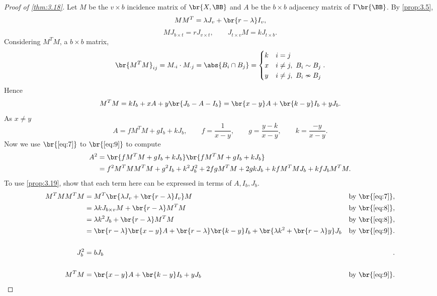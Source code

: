 \begin{proof}[Proof of \ref{thm:3.18}]
Let $ M $ be the $ v \times b $ incidence matrix of $ \br{X, \BB} $ and $ A $ be the $ b \times b $ adjacency matrix of $ \Gamma\br{\BB} $. By \ref{prop:3.5},
\begin{equation}
\label{eq:7}
MM^T = \lambda J_v + \br{r - \lambda}I_v,
\end{equation}
\begin{equation}
\label{eq:8}
MJ_{b \times t} = rJ_{v \times t}, \qquad J_{t \times v}M = kJ_{t \times b}.
\end{equation}
Considering $ M^TM $, a $ b \times b $ matrix,
$$ \br{M^TM}_{ij} = M_{\cdot i} \cdot M_{\cdot j} = \abs{B_i \cap B_j} =
\begin{cases}
k & i = j \\
x & i \ne j, \ B_i \sim B_j \\
y & i \ne j, \ B_i \nsim B_j
\end{cases}.
$$
Hence
\begin{equation}
\label{eq:9}
M^TM = kI_b + xA + y\br{J_b - A - I_b} = \br{x - y}A + \br{k - y}I_b + yJ_b.
\end{equation}
As $ x \ne y $
$$ A = fM^TM + gI_b + kJ_b, \qquad f = \dfrac{1}{x - y}, \qquad g = \dfrac{y - k}{x - y}, \qquad k = \dfrac{-y}{x - y}. $$
Now we use $ \br{\ref{eq:7}} $ to $ \br{\ref{eq:9}} $ to compute
\begin{align*}
A^2
& = \br{fM^TM + gI_b + kJ_b}\br{fM^TM + gI_b + kJ_b} \\
& = f^2M^TMM^TM + g^2I_b + k^2J_b^2 + 2fgM^TM + 2gkJ_b + kfM^TMJ_b + kfJ_bM^TM.
\end{align*}
To use \ref{prop:3.19}, show that each term here can be expressed in terms of $ A, I_b, J_b $.
\begin{align*}
M^TMM^TM
& = M^T\br{\lambda J_v + \br{r - \lambda}I_v}M & \text{by} \ \br{\ref{eq:7}}, \\
& = \lambda kJ_{b \times v}M + \br{r - \lambda}M^TM & \text{by} \ \br{\ref{eq:8}}, \\
& = \lambda k^2J_b + \br{r - \lambda}M^TM & \text{by} \ \br{\ref{eq:8}}, \\
& = \br{r - \lambda}\br{x - y}A + \br{r - \lambda}\br{k - y}I_b + \br{\lambda k^2 + \br{r - \lambda}y}J_b & \text{by} \ \br{\ref{eq:9}}. \\
\\
J_b^2
& = bJ_b & . \\
\\
M^TM
& = \br{x - y}A + \br{k - y}I_b + yJ_b & \text{by} \ \br{\ref{eq:9}}. \\

\end{align*}
\end{proof}
